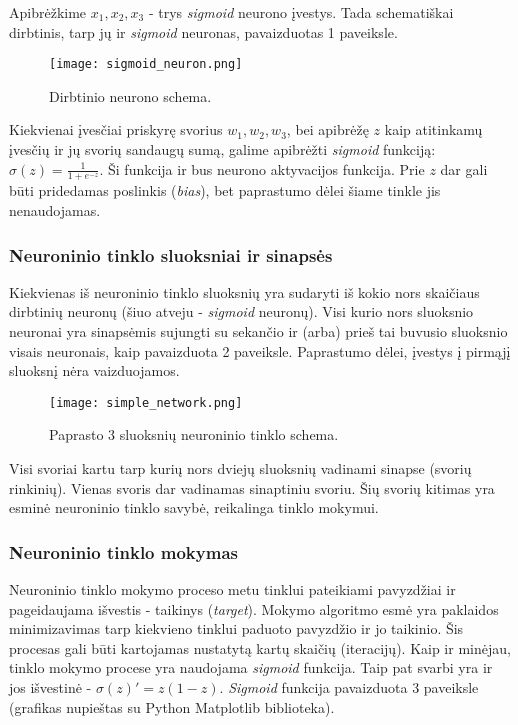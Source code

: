 \documentclass[a4paper,12pt]{article}
\begin{document}
Apibrėžkime $x_{1}, x_{2}, x_{3}$ - trys \textit{sigmoid} neurono įvestys. Tada schematiškai dirbtinis, tarp jų ir \textit{sigmoid} neuronas, pavaizduotas 1 paveiksle.
\medskip
\begin{figure}[h]
	\centering
		\texttt{[image: sigmoid\_neuron.png]}
	\caption{Dirbtinio neurono schema\cite{michaelnielsen}.}
\end{figure}

Kiekvienai įvesčiai priskyrę svorius $w_{1}, w_{2}, w_{3}$, bei apibrėžę $z$ kaip atitinkamų įvesčių ir jų svorių sandaugų sumą, galime apibrėžti \textit{sigmoid} funkciją: $\sigma(z) = \frac{1}{1+e^{-z}}$. Ši funkcija ir bus neurono aktyvacijos funkcija. Prie $z$ dar gali būti pridedamas poslinkis (\textit{bias}), bet paprastumo dėlei šiame tinkle jis nenaudojamas\cite{howardholley}.

\subsubsection{Neuroninio tinklo sluoksniai ir sinapsės}
\indent\indent
Kiekvienas iš neuroninio tinklo sluoksnių yra sudaryti iš kokio nors skaičiaus dirbtinių neuronų (šiuo atveju - \textit{sigmoid} neuronų). Visi kurio nors sluoksnio neuronai yra sinapsėmis sujungti su sekančio ir (arba) prieš tai buvusio sluoksnio visais neuronais, kaip pavaizduota 2 paveiksle. Paprastumo dėlei, įvestys į pirmąjį sluoksnį nėra vaizduojamos.

\begin{figure}[h]
	\centering
		\texttt{[image: simple\_network.png]}
	\caption{Paprasto 3 sluoksnių neuroninio tinklo schema\cite{michaelnielsen}.}
\end{figure}

Visi svoriai kartu tarp kurių nors dviejų sluoksnių vadinami sinapse (svorių rinkinių). Vienas svoris dar vadinamas sinaptiniu svoriu. Šių svorių kitimas yra esminė neuroninio tinklo savybė, reikalinga tinklo mokymui. 

\subsubsection{Neuroninio tinklo mokymas}
\indent\indent
Neuroninio tinklo mokymo proceso metu tinklui pateikiami pavyzdžiai ir pageidaujama išvestis - taikinys (\textit{target}). Mokymo algoritmo esmė yra paklaidos minimizavimas tarp kiekvieno tinklui paduoto pavyzdžio ir jo taikinio. Šis procesas gali būti kartojamas nustatytą kartų skaičių (iteracijų). Kaip ir minėjau, tinklo mokymo procese yra naudojama \textit{sigmoid} funkcija. Taip pat svarbi yra ir jos išvestinė - $\sigma(z)' = z(1-z)$. \textit{Sigmoid} funkcija pavaizduota 3 paveiksle (grafikas nupieštas su Python Matplotlib biblioteka).
\end{document}
